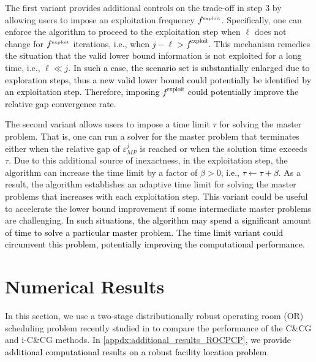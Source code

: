 \documentclass[preprint,review,11pt]{elsarticle}
\theoremstyle{definition}
\theoremstyle{remark}
\newcommand{\blue}{\textcolor{black}}
\begin{document}
The first variant provides additional controls on the trade-off in step 3 by allowing users to impose an exploitation frequency $f^{\mbox{\tiny exploit}}$. Specifically, one can enforce the algorithm to proceed to the exploitation step when $\ell$ does not change for $f^{\mbox{\tiny exploit}}$ iterations, \blue{i.e., when $j-\ell>f^\text{exploit}$}. This mechanism remedies the situation that the valid lower bound information is not exploited for a long time, i.e., $\ell \ll j$. \blue{In such a case, the scenario set is substantially enlarged due to exploration steps, thus a new valid lower bound could potentially be identified by an exploitation step. Therefore, imposing $f^\text{exploit}$ could potentially improve the relative gap convergence rate.
} 

The second variant allows users to impose a time limit $\tau$ for solving the master problem. That is, one can run a solver for the master problem that terminates either when the relative gap of $\varepsilon_{MP}^j$ is reached or when the solution time exceeds $\tau$. Due to this additional source of inexactness, in the exploitation step, the algorithm can increase the time limit by a factor of $\beta>0$, \blue{i.e., $\tau\leftarrow\tau+\beta$}.  As a result, the algorithm establishes an adaptive time limit for solving the master problems that increases with each exploitation step. This variant could be useful to accelerate the lower bound improvement if some intermediate master problems are challenging. \blue{In such situations, the algorithm may spend a significant amount of time to solve a particular master problem. The time limit variant could circumvent this problem, potentially improving the computational performance.}

\section{Numerical Results}\label{sec:num_expt}

In this section, we use a two-stage distributionally robust operating room (OR) scheduling problem recently studied in \cite{Wang_et_al:2019} to compare the performance of the C\&CG and i-C\&CG methods. \blue{In \ref{appdx:additional_results_ROCPCP}, we provide additional computational results on a robust facility location problem.}
\end{document}
